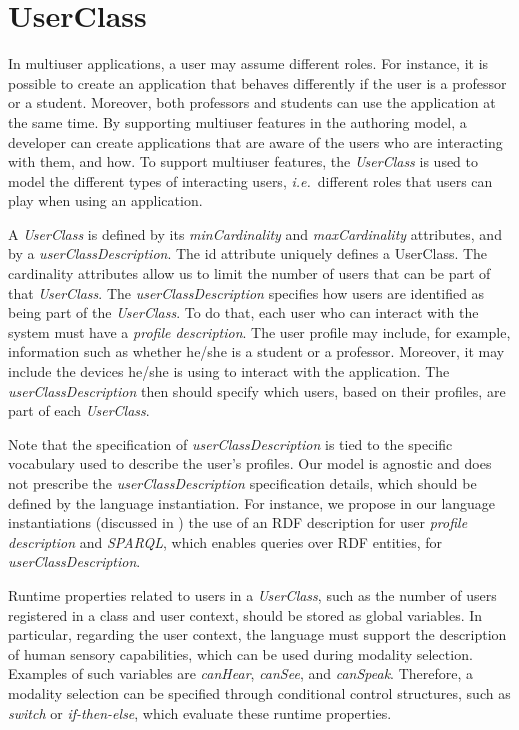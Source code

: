 \section{UserClass}
\label{sec:approuach:userclass}

In multiuser applications, a user may assume different roles. For instance, it
is possible to create an application that behaves differently if the user is a
professor or a student. Moreover, both professors and students can use the
application at the same time. By supporting multiuser features in the authoring
model, a developer can create applications that are aware of the users who are
interacting with them, and how. To support multiuser features, the
\textit{UserClass} is used to model the different types of interacting users,
\textit{i.e.}~different roles that users can play when using an application.

A \textit{UserClass} is defined by its \textit{minCardinality} and
\textit{maxCardinality} attributes, and by a \textit{userClassDescription}. The
id attribute uniquely defines a UserClass. The cardinality attributes allow us
to limit the number of users that can be part of that \textit{UserClass}. The
\textit{userClassDescription} specifies how users are identified as being part
of the \textit{UserClass}. To do that, each user who can interact with the
system must have a \textit{profile description}. The user profile may include,
for example, information such as whether he/she is a student or a professor.
Moreover, it may include the devices he/she is using to interact with the
application. The \textit{userClassDescription} then should specify which users,
based on their profiles, are part of each \textit{UserClass}.

Note that the specification of \textit{userClassDescription} is tied to the
specific vocabulary used to describe the user’s profiles. Our model is agnostic
and does not prescribe the \textit{userClassDescription} specification details,
which should be defined by the language instantiation. For instance, we propose
in our language instantiations (discussed in ) the use
of an RDF description for user
\textit{profile description }and \textit{SPARQL}, which enables queries over RDF
entities, for
\textit{userClassDescription}.

Runtime properties related to users in a \textit{UserClass}, such as the number
of users registered in a class and user context, should be stored as global
variables. In particular, regarding the user context, the language must support
the description of human sensory capabilities, which can be used during modality
selection. Examples of such variables are \textit{canHear}, \textit{canSee}, and
\textit{canSpeak}. Therefore, a modality selection can be specified through
conditional control structures, such as \textit{switch }or
\textit{if-then-else}, which evaluate these runtime properties.

